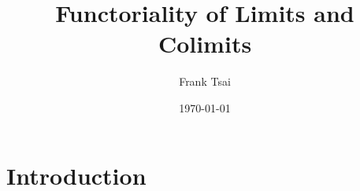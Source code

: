 \documentclass{amsart}
\title{Functoriality of Limits and Colimits}
\author{Frank Tsai}
\date{\today}
\begin{document}
\maketitle
\tableofcontents

\section{Introduction}
\label{sec:introduction}





\end{document}
